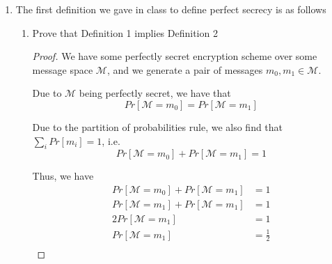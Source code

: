 \documentclass{article}
\begin{document}
\begin{enumerate}
\begin{enumerate}
\begin{proof}
          Suppose $Pr[M = m_0] \neq Pr[M = m_1]$, where
          $Pr[M = m_0] + Pr[M = m_1] = 1$.

          By perfect secrecy, we have that $Pr[M = m_0 \mid C = c] =
          Pr[M = m_0] \neq Pr[M = m_1] + Pr[M = m_1 \mid C = c]$.

          However, we find that $Pr[M = m_0] = Pr[M = m_1]$, which is a
          contradiction for the fact that $Pr[M = m_0] \neq Pr[M = m_1]$.
        \end{proof}

      \item An encryption scheme with message space M is perfectly secret if and 
        only if for every probability distribution over $\mathcal{M}$ and every
        $c_0, c_1 \in C$ 
        we have $Pr\left[C = c_0\right] = Pr\left[C = c_1\right]$.
    \end{enumerate}
  \item The first definition we gave in class to define perfect secrecy is as follows
    \begin{enumerate}
      \item Prove that Definition 1 implies Definition 2

        \begin{proof}
          We have some perfectly secret encryption scheme over some message 
          space $\mathcal{M}$, and we generate a pair of messages 
          $m_0, m_1 \in \mathcal{M}$.

          Due to $\mathcal{M}$ being perfectly secret, we have that
          \[
            Pr[\mathcal{M} = m_0] = Pr[\mathcal{M} = m_1]
          \]

          Due to the partition of probabilities rule, we also find that
          $\sum\limits_{i} Pr[m_i] = 1$, i.e.
          \[
            Pr[\mathcal{M} = m_0] + Pr[\mathcal{M} = m_1] = 1
          \]

          Thus, we have
          \begin{align*}
            Pr[\mathcal{M} = m_0] + Pr[\mathcal{M} = m_1] &= 1\\
            Pr[\mathcal{M} = m_1] + Pr[\mathcal{M} = m_1] &= 1\\
            2Pr[\mathcal{M} = m_1] &= 1\\
            Pr[\mathcal{M} = m_1] &= \frac{1}{2}\\
          \end{align*}
        \end{proof}


\end{enumerate}
\end{enumerate}
\end{document}

